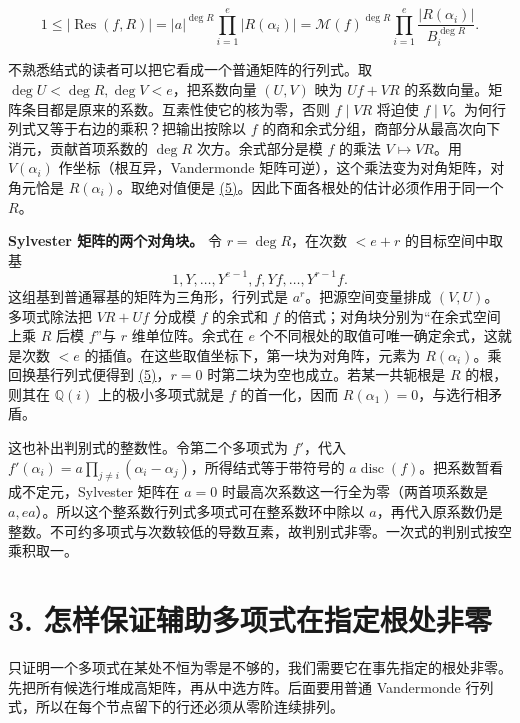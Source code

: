 \documentclass[11pt,a4paper]{article}
\begin{document}
\[
 1\le|\operatorname{Res}(f,R)|
 =|a|^{\deg R}\prod_{i=1}^e |R(\alpha_i)|
 =\mathcal M(f)^{\deg R}\prod_{i=1}^e
               \frac{|R(\alpha_i)|}{B_i^{\deg R}}.                         \tag{5}\label{eq:5}
\]

不熟悉结式的读者可以把它看成一个普通矩阵的行列式。取 \(\deg U<\deg R,\deg V<e\)，把系数向量 \((U,V)\) 映为 \(Uf+VR\) 的系数向量。矩阵条目都是原来的系数。互素性使它的核为零，否则 \(f\mid VR\) 将迫使 \(f\mid V\)。为何行列式又等于右边的乘积？把输出按除以 \(f\) 的商和余式分组，商部分从最高次向下消元，贡献首项系数的 \(\deg R\) 次方。余式部分是模 \(f\) 的乘法 \(V\mapsto VR\)。用 \(V(\alpha_i)\) 作坐标（根互异，Vandermonde 矩阵可逆），这个乘法变为对角矩阵，对角元恰是 \(R(\alpha_i)\)。取绝对值便是 \hyperref[eq:5]{(5)}。因此下面各根处的估计必须作用于同一个 \(R\)。

\textbf{Sylvester 矩阵的两个对角块。} 令 \(r=\deg R\)，在次数 \(<e+r\) 的目标空间中取基 \[
 1,Y,\ldots,Y^{e-1},f,Yf,\ldots,Y^{r-1}f.
\] 这组基到普通幂基的矩阵为三角形，行列式是 \(a^r\)。把源空间变量排成 \((V,U)\)。多项式除法把 \(VR+Uf\) 分成模 \(f\) 的余式和 \(f\) 的倍式；对角块分别为``在余式空间上乘 \(R\) 后模 \(f\)''与 \(r\) 维单位阵。余式在 \(e\) 个不同根处的取值可唯一确定余式，这就是次数 \(<e\) 的插值。在这些取值坐标下，第一块为对角阵，元素为 \(R(\alpha_i)\)。乘回换基行列式便得到 \hyperref[eq:5]{(5)}，\(r=0\) 时第二块为空也成立。若某一共轭根是 \(R\) 的根，则其在 \(\mathbb Q(i)\) 上的极小多项式就是 \(f\) 的首一化，因而 \(R(\alpha_1)=0\)，与选行相矛盾。

这也补出判别式的整数性。令第二个多项式为 \(f'\)，代入 \(f'(\alpha_i)=a\prod_{j\ne i}(\alpha_i-\alpha_j)\)，所得结式等于带符号的 \(a\operatorname{disc}(f)\)。把系数暂看成不定元，Sylvester 矩阵在 \(a=0\) 时最高次系数这一行全为零（两首项系数是 \(a,ea\)）。所以这个整系数行列式多项式可在整系数环中除以 \(a\)，再代入原系数仍是整数。不可约多项式与次数较低的导数互素，故判别式非零。一次式的判别式按空乘积取一。

\section{3. 怎样保证辅助多项式在指定根处非零}\label{ux600eux6837ux4fddux8bc1ux8f85ux52a9ux591aux9879ux5f0fux5728ux6307ux5b9aux6839ux5904ux975eux96f6}

只证明一个多项式在某处不恒为零是不够的，我们需要它在事先指定的根处非零。先把所有候选行堆成高矩阵，再从中选方阵。后面要用普通 Vandermonde 行列式，所以在每个节点留下的行还必须从零阶连续排列。
\end{document}
